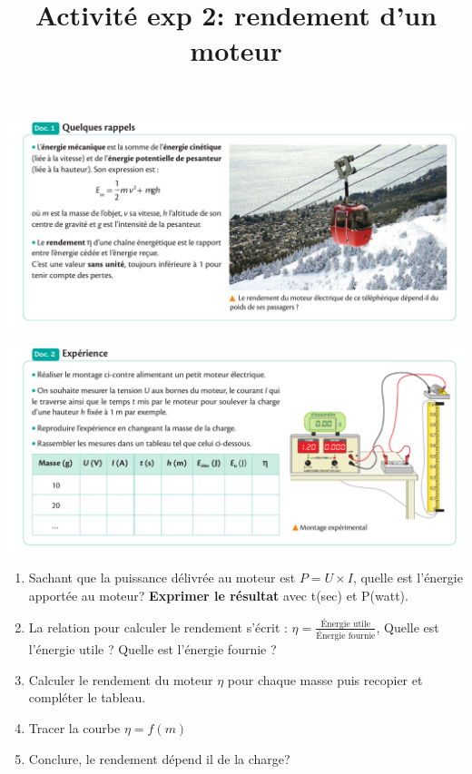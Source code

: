 \documentclass[10pt]{article}
\newcommand{\titreActivite}{Activité exp 2: rendement d'un moteur} %
\begin{document}
\date{}
\title{\titreActivite}
\maketitle %

\begin{center}
	\includegraphics[scale=0.38]{1.png}
\end{center}
\vspace{-10pt}

\begin{center}
	\includegraphics[scale=0.38]{2.png}
\end{center}


\begin{enumerate}
	\item Sachant que la puissance délivrée au moteur est $P = U \times I$, quelle est l'énergie apportée au moteur?
	      \textbf{Exprimer le résultat} avec t(sec) et P(watt).
	\item La relation pour calculer le rendement s'écrit : $\eta = \displaystyle\frac{\text{Énergie utile}}{\text{Énergie fournie}}$, Quelle est l'énergie utile ? Quelle est l'énergie fournie ?
	\item Calculer le rendement du moteur $\eta$ pour chaque masse puis recopier et compléter le tableau.
	\item Tracer la courbe $\eta = f(m)$
	\item Conclure, le rendement dépend il de la charge?
\end{enumerate}
\end{document}
